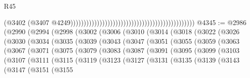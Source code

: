 \begin{lexlean}{R45}
\begin{coremodule}
{                                                                                              (@3402
                                                                                                (@3407
                                                                                                  @4249)))))))))))))))))))))))))))))))))))))))))))))))
@4345 := @2986
    (@2990
      (@2994
        (@2998
          (@3002
            (@3006
              (@3010
                (@3014
                  (@3018
                    (@3022
                      (@3026
                        (@3030
                          (@3034
                            (@3035
                              (@3039
                                (@3043
                                  (@3047
                                    (@3051
                                      (@3055
                                        (@3059
                                          (@3063
                                            (@3067
                                              (@3071
                                                (@3075
                                                  (@3079
                                                    (@3083
                                                      (@3087
                                                        (@3091
                                                          (@3095
                                                            (@3099
                                                              (@3103
                                                                (@3107
                                                                  (@3111
                                                                    (@3115
                                                                      (@3119
                                                                        (@3123
                                                                          (@3127
                                                                            (@3131
                                                                              (@3135
                                                                                (@3139
                                                                                  (@3143
                                                                                    (@3147
                                                                                      (@3151
                                                                                        (@3155
}
\end{coremodule}
\end{lexlean}

